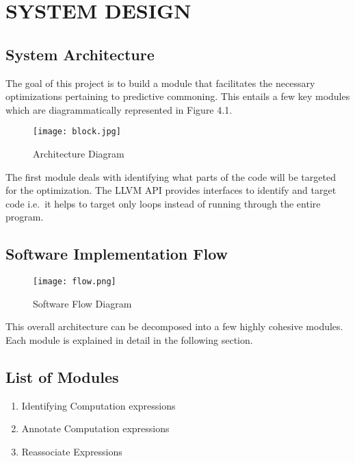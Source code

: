 \chapter{SYSTEM DESIGN} %

\section{System Architecture}
The goal of this project is to build a module that facilitates the necessary optimizations pertaining to predictive commoning. This entails a few key modules which are diagrammatically represented in Figure 4.1.
\newline

\begin{figure}[H]
	\centering
	\texttt{[image: block.jpg]}
	\caption{Architecture Diagram}
	\label{ArchDia}	
\end{figure}


The first module deals with identifying what parts of the code will be targeted for the optimization. The LLVM API provides interfaces to identify and target code i.e.\ it helps to target only loops instead of running through the entire program. \\ 

\section{Software Implementation Flow}

\begin{figure}[H]
	\centering
	\texttt{[image: flow.png]}
	\caption{Software Flow Diagram}
	\label{Software Flow}	
\end{figure}


This overall architecture can be decomposed into a few highly cohesive modules. Each module is explained in detail in the following section.

\section{List of Modules}
\begin{enumerate}
	\item Identifying Computation expressions
	\item Annotate Computation expressions
	\item Reassociate Expressions
\end{enumerate}


